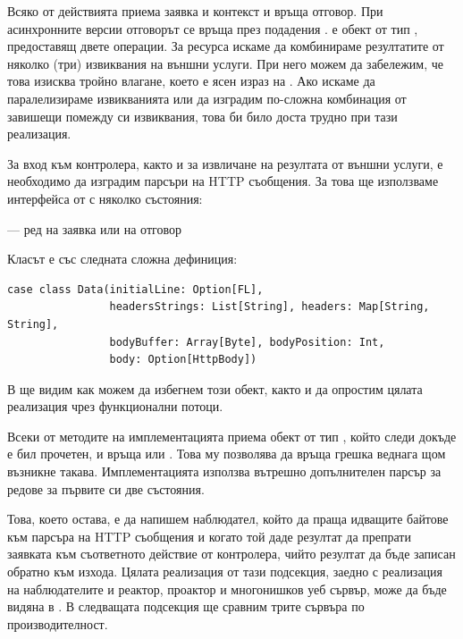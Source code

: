 Всяко от действията приема заявка и контекст и връща отговор. При асинхронните версии отговорът се връща през подадения  .  е обект от тип , предоставящ двете операции. За ресурса  искаме да комбинираме резултатите от няколко (три) извиквания на външни услуги. При него можем да забележим, че това изисква тройно влагане, което е ясен израз на . Ако искаме да паралелизираме извикванията или да изградим по-сложна комбинация от завишещи помежду си извиквания, това би било доста трудно при тази реализация.

За вход към контролера, както и за извличане на резултата от външни услуги, е необходимо да изградим парсъри на HTTP съобщения. За това ще използваме интерфейса от  с няколко състояния:

\begin{enumerate*}
  \item {} — ред на заявка или на отговор
  \item {}
  \item {}
\end{enumerate*}

Класът  е със следната сложна дефиниция:

\begin{lstlisting}
case class Data(initialLine: Option[FL],
                headersStrings: List[String], headers: Map[String, String],
                bodyBuffer: Array[Byte], bodyPosition: Int,
                body: Option[HttpBody])
\end{lstlisting}

В  ще видим как можем да избегнем този обект, както и да опростим цялата реализация чрез функционални потоци.

Всеки от методите на имплементацията приема обект от тип , който следи докъде е бил прочетен, и връща  или . Това му позволява да връща грешка веднага щом възникне такава. Имплементацията използва вътрешно допълнителен парсър за редове за първите си две състояния.

Това, което остава, е да напишем наблюдател, който да праща идващите байтове към парсъра на HTTP съобщения и когато той даде резултат да препрати заявката към съответното действие от контролера, чийто резултат да бъде записан обратно към изхода. Цялата реализация от тази подсекция, заедно с реализация на наблюдателите и реактор, проактор и многонишков уеб сървър, може да бъде видяна в . В следващата подсекция ще сравним трите сървъра по производителност.

